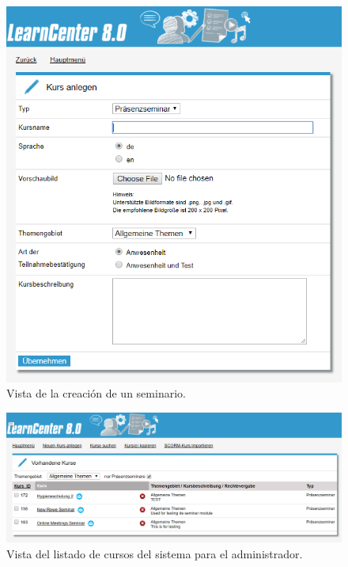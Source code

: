 \begin{figure}[h]
	\begin{center}
		\includegraphics[width=\textwidth]{screenshots/creacion_seminario.png}
		\caption{Vista de la creación de un seminario.} \label{fig:creacionSeminario}
	\end{center}
\end{figure}

\begin{figure}[h]
	\begin{center}
		\includegraphics[width=\textwidth]{screenshots/admin_listar_cursos.png}
		\caption{Vista del listado de cursos del sistema para el administrador.} \label{fig:listarCursos}
	\end{center}
\end{figure}

